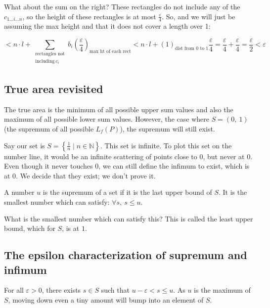 \documentclass[12pt]{article}
\theoremstyle{plain}
\theoremstyle{remark}
\theoremstyle{definition}
\begin{document}
What about the sum on the right? These rectangles do not include any of
the \(c_{1\ldots i\ldots n}\), so the height of these rectangles is at
most \(\frac{\varepsilon}{4}\). So, and we will just be assuming the max
height and that it does not cover a length over 1:

\[{}{< n \cdot l + \sum_{\begin{matrix}
\text{rectangles\ not} \\
\text{including}\ c_{i} \\
\end{matrix}}^{}{b_{i}\left( \frac{\varepsilon}{4} \right)_{\text{max\ ht\ of\ each\ rect}}} }{< n \cdot l + (1)_{\text{dist\ from\ 0\ to\ 1}}\frac{\varepsilon}{4} = \frac{\varepsilon}{4} + \frac{\varepsilon}{4} = \frac{\varepsilon}{2} < \varepsilon} \]



\subsection{True area revisited}

The true area is the minimum of all possible upper sum values and also
the maximum of all possible lower sum values. However, the case where
\(S = (0,\ 1)\) (the supremum of all possible \(L_{f}(P)\)), the
supremum will still exist.

Say our set is \(S = \left\{ \frac{1}{n}\mid n\mathbb{\in N} \right\}\).
This set is infinite. To plot this set on the number line, it would be
an infinite scattering of points close to 0, but never at 0. Even though
it never touches 0, we can still define the infimum to exist, which is
at 0. We decide that they exist; we don't prove it.

A number \(u\) is the supremum of a set if it is the last upper bound of
\(S\). It is the smallest number which can satisfy:
\(\forall s,\ s \leq u\).

What is the smallest number which can satisfy this? This is called the
least upper bound, which for \(S\), is at \(1\).


\subsection{The epsilon characterization of supremum and
infimum}

For all \(\varepsilon > 0\), there exists \(s \in S\) such that
\(u - \varepsilon < s \leq u\). As \(u\) is the maximum of \(S\), moving
down even a tiny amount will bump into an element of \(S\).
\end{document}
